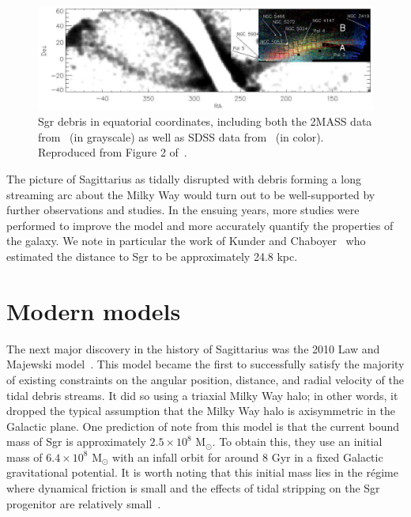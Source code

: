 \begin{figure}
    \centering 
    \includegraphics[width=0.95\linewidth]{figs/belokurov2006-2.png}
    \caption{%
        Sgr debris in equatorial coordinates, including both the 2MASS data
        from~\cite{majewski_two_2003} (in grayscale) as well as SDSS data
        from~\cite{belokurov_field_2006} (in color). Reproduced from Figure 2
        of~\cite{belokurov_field_2006}.
    }
    \label{fig:belokurov2006}
\end{figure}

The picture of Sagittarius as tidally disrupted with debris forming a long
streaming arc about the Milky Way would turn out to be well-supported by
further observations and studies. In the ensuing years, more studies were
performed to improve the model and more accurately quantify the properties of
the galaxy. We note in particular the work of Kunder and
Chaboyer~\cite{kunder_distance_2009} who estimated the distance to Sgr to be
approximately 24.8 kpc.


\hypertarget{modern-models}{%
\section{Modern models}\label{modern-models}}

The next major discovery in the history of Sagittarius was the 2010 Law and
Majewski model~\cite{law_sagittarius_2010}. This model became the first to
successfully satisfy the majority of existing constraints on the angular
position, distance, and radial velocity of the tidal debris streams. It did so
using a triaxial Milky Way halo; in other words, it dropped the typical
assumption that the Milky Way halo is axisymmetric in the Galactic plane. One
prediction of note from this model is that the current bound mass of Sgr is
approximately \(2.5 \times 10^8\) M\(_\odot\). To obtain this, they use an
initial mass of \(6.4 \times 10^8\) M\(_\odot\) with an infall orbit for
around 8 Gyr in a fixed Galactic gravitational potential. It is worth noting
that this initial mass lies in the régime where dynamical friction is small
and the effects of tidal stripping on the Sgr progenitor are relatively
small~\cite{dierickx_predicted_2017}.

